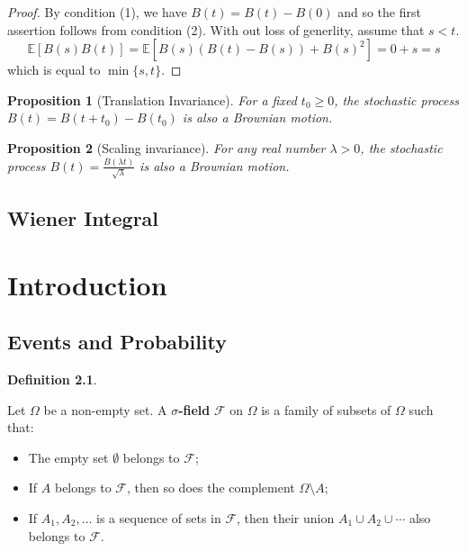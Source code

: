 \documentclass[
]{book}
\providecommand{\tightlist}{%
  \setlength{\itemsep}{0pt}\setlength{\parskip}{0pt}}
\newtheorem{proposition}{Proposition}[chapter]
\theoremstyle{definition}
\newtheorem{definition}{Definition}[chapter]
\theoremstyle{definition}
\theoremstyle{definition}
\theoremstyle{definition}
\theoremstyle{remark}
\begin{document}
\begin{proof}
By condition (1), we have \(B(t) = B(t)−B(0)\) and so the first assertion follows from condition (2). With out loss of generlity, assume that \(s<t\).
\[\mathbb{E}[B(s)B(t)] = \mathbb{E}[B(s)(B(t) - B(s)) + B(s)^2]= 0 + s = s\]
which is equal to \(\min\{s, t\}\).
\end{proof}

\begin{proposition}[Translation Invariance]
\protect\hypertarget{prp:unnamed-chunk-5}{}\label{prp:unnamed-chunk-5}For a fixed \(t_0 \geq 0\), the stochastic process \(B(t) = B(t + t_0) - B(t_0)\) is also a Brownian motion.
\end{proposition}

\begin{proposition}[Scaling invariance]
\protect\hypertarget{prp:unnamed-chunk-6}{}\label{prp:unnamed-chunk-6}For any real number \(\lambda > 0\), the stochastic process
\(B(t) = \frac{B(\lambda t)}{\sqrt{\lambda}}\)
is also a Brownian motion.
\end{proposition}

\section{Wiener Integral}\label{wiener-integral}

\chapter{Introduction}\label{introduction}

\section{Events and Probability}\label{events-and-probability}

\begin{definition}
\protect\hypertarget{def:unnamed-chunk-7}{}\label{def:unnamed-chunk-7}

Let \(\Omega\) be a non-empty set. A \textbf{\(\sigma\)-field} \(\mathcal{F}\) on \(\Omega\) is a family of subsets of \(\Omega\) such that:

\begin{itemize}
\tightlist
\item
  The empty set \(\emptyset\) belongs to \(\mathcal{F}\);
\item
  If \(A\) belongs to \(\mathcal{F}\), then so does the complement \(\Omega \setminus A\);
\item
  If \(A_1, A_2, \ldots\) is a sequence of sets in \(\mathcal{F}\), then their union \(A_1 \cup A_2 \cup \cdots\) also belongs to \(\mathcal{F}\).
\end{itemize}

\end{definition}
\end{document}
